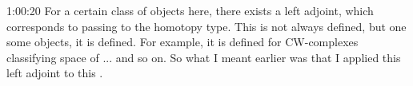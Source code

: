 \begin{unfinished}{1:00:20}
For a certain class of objects here, there exists a left adjoint, which corresponds to passing to the homotopy type. This is not always defined, but one some objects, it is defined. For example, it is defined for CW-complexes classifying space of ...  and so on.
So what I meant earlier  was that I applied this left adjoint to this .

\end{unfinished}